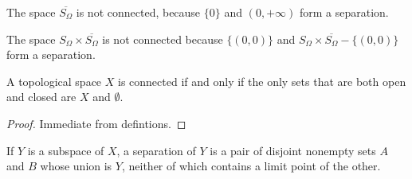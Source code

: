 \begin{example}
    The space $\overline{S_\Omega}$ is not connected, because $\{0\}$ and $(0, +\infty)$ form a separation.
\end{example}

\begin{example}
    The space $S_\Omega \times \overline{S_\Omega}$ is not connected because $\{(0,0)\}$
    and $S_\Omega \times \overline{S_\Omega} - \{(0,0)\}$ form a separation.
\end{example}

\begin{proposition}
    \label{proposition:open_closed_connective}
    A topological space $X$ is connected if and only if the only sets that are both open and closed are $X$ and $\emptyset$.
\end{proposition}

\begin{proof}
    Immediate from defintions.
\end{proof}

\begin{lemma}
    \label{lemma:limit_point_separation}
    If $Y$ is a subspace of $X$, a separation of $Y$ is a pair of disjoint nonempty sets $A$ and $B$ whose union is $Y$, neither of which contains a limit point of the other.
\end{lemma}

